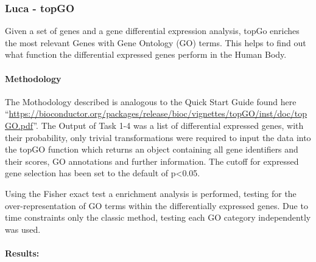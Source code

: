 \documentclass[
]{article}
\begin{document}
\subsubsection{Luca - topGO}\label{luca---topgo}

Given a set of genes and a gene differential expression analysis, topGo
enriches the most relevant Genes with Gene Ontology (GO) terms. This
helps to find out what function the differential expressed genes perform
in the Human Body.

\paragraph{Methodology}\label{methodology}

The Mothodology described is analogous to the Quick Start Guide found
here
``\url{https://bioconductor.org/packages/release/bioc/vignettes/topGO/inst/doc/topGO.pdf}''.
The Output of Task 1-4 was a list of differential expressed genes, with
their probability, only trivial transformations were required to input
the data into the topGO function which returns an object containing all
gene identifiers and their scores, GO annotations and further
information. The cutoff for expressed gene selection has been set to the
default of p\textless0.05.

Using the Fisher exact test a enrichment analysis is performed, testing
for the over-representation of GO terms within the differentially
expressed genes. Due to time constraints only the classic method,
testing each GO category independently was used.

\paragraph{Results:}\label{results}
\end{document}
